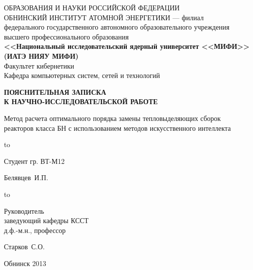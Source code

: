 
\begin{titlepage}
\newpage

\begin{center}
{\small{} ОБРАЗОВАНИЯ И НАУКИ РОССИЙСКОЙ ФЕДЕРАЦИИ\\
ОБНИНСКИЙ ИНСТИТУТ АТОМНОЙ ЭНЕРГЕТИКИ --- филиал}\\
федерального государственного автономного образовательного учреждения\\
высшего профессионального образования\\
{\bf<<Национальный исследовательский ядерный университет <<МИФИ>>\\
(ИАТЭ НИЯУ МИФИ)}\\
\vspace{2em}
Факультет кибернетики\\
Кафедра компьютерных систем, сетей и технологий
\end{center}
\vspace{2em}


\vspace{5em}
\begin{center}
\textbf{ПОЯСНИТЕЛЬНАЯ ЗАПИСКА\\ К НАУЧНО-ИССЛЕДОВАТЕЛЬСКОЙ РАБОТЕ}
\end{center}


\begin{center}
Метод расчета оптимального порядка замены тепловыделяющих  сборок реакторов класса БН с использованием методов искусственного интеллекта 
\end{center}

\vspace{6em}

\hbox to \textwidth
{\parbox{6 cm}{Студент гр. ВТ-М12}\dotfill \parbox{4 cm}{
\begin{flushright}Белявцев~И.П.\end{flushright}}}
\vspace{2em}

\hbox to \textwidth
{\parbox{6 cm}{Руководитель\\ заведующий кафедры КССТ\\ д.ф.-м.н., профессор}\dotfill \parbox{4 cm}{
\begin{flushright}Старков~С.О.\end{flushright}}}
\vspace{2em}



\vspace{\fill}

\begin{center}
Обнинск 2013
\end{center}

\end{titlepage}